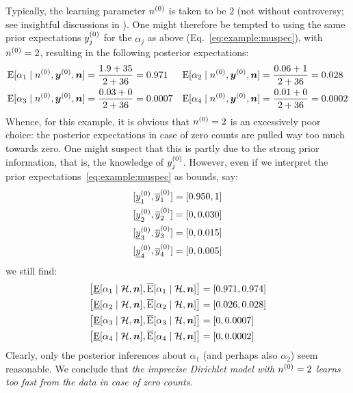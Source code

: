 Typically, the learning parameter $n^{(0)}$ is taken to be $2$
(not without controversy; see insightful discussions in \textcite{1996:walley::idm}).
One might therefore be tempted to using the same prior expectations
$y^{(0)}_j$ for the $\alpha_j$ as above (Eq.~\eqref{eq:example:muspec}), with $n^{(0)}=2$,
resulting in the following posterior expectations:
\begin{align*}
  \operatorname{E}[\alpha_1\mid n^{(0)},{\bm y}^{(0)},{\bm n}] &= \frac{1.9 + 35}{2 + 36} = 0.971
  &
  \operatorname{E}[\alpha_2\mid n^{(0)},{\bm y}^{(0)},{\bm n}] &= \frac{0.06 + 1}{2 + 36} = 0.028
  \\
  \operatorname{E}[\alpha_3\mid n^{(0)},{\bm y}^{(0)},{\bm n}] &= \frac{0.03 + 0}{2 + 36} = 0.0007
  &
  \operatorname{E}[\alpha_4\mid n^{(0)},{\bm y}^{(0)},{\bm n}] &= \frac{0.01 + 0}{2 + 36} = 0.0002
\end{align*}
Whence, for this example, it is obvious that $n^{(0)}=2$ is an excessively poor choice:
the posterior expectations in case of zero counts are pulled way too much towards zero.
One might suspect that this is partly due to the strong prior information,
that is, the knowledge of $y^{(0)}_j$.
However, even if we interpret the prior expectations~\eqref{eq:example:muspec} as bounds, say:
\begin{subequations}
  \label{eq:example:tintervals}
\begin{align} %
  [\yzl_1,\yzu_1] &= [0.950,1]
  \\
  [\yzl_2,\yzu_2] &= [0,0.030]
  \\
  [\yzl_3,\yzu_3] &= [0,0.015]
  \\
  [\yzl_4,\yzu_4] &= [0,0.005]
\end{align}
\end{subequations}
we still find:
\begin{subequations}
\begin{align}
  \big[
  \El[\alpha_1\mid\mathcal{H},\vec{n}] %
  ,
  \Eu[\alpha_1\mid\mathcal{H},\vec{n}] %
  \big]
  &=
  [
  0.971
  ,
  0.974
  ]
  \\
  \big[
  \El[\alpha_2\mid\mathcal{H},\vec{n}] %
  ,
  \Eu[\alpha_2\mid\mathcal{H},\vec{n}] %
  \big]
  &=
  [
  0.026
  ,
  0.028
  ]
  \\
  \big[
  \El[\alpha_3\mid\mathcal{H},\vec{n}] %
  ,
  \Eu[\alpha_3\mid\mathcal{H},\vec{n}] %
  \big]
  &=
  [
  0
  ,
  0.0007
  ]
  \\
  \big[
  \El[\alpha_4\mid\mathcal{H},\vec{n}] %
  ,
  \Eu[\alpha_4\mid\mathcal{H},\vec{n}] %
  \big]
  &=
  [
  0
  ,
  0.0002
  ]
\end{align}
\end{subequations}
Clearly, only the posterior inferences about $\alpha_1$ (and perhaps also $\alpha_2$) seem reasonable.
We conclude that \emph{the imprecise Dirichlet model with $n^{(0)}=2$ learns too fast from the data in case of zero counts}.

